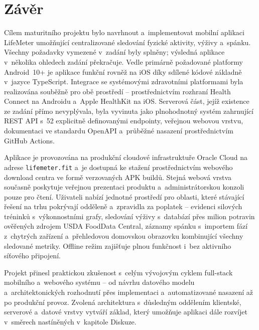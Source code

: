 \chapter*{Závěr}

Cílem maturitního projektu bylo navrhnout a~implementovat mobilní aplikaci
LifeMeter umožňující centralizované sledování fyzické aktivity, výživy a~spánku.
Všechny požadavky vymezené v~zadání byly splněny; výsledná aplikace v~několika
ohledech zadání překračuje. Vedle primárně požadované platformy Android~10+
je aplikace funkční rovněž na iOS díky sdílené kódové základně v~jazyce
TypeScript. Integrace se systémovými zdravotními platformami byla realizována
souběžně pro obě prostředí -- prostřednictvím rozhraní Health Connect na
Androidu a~Apple HealthKit na iOS. Serverová část, jejíž existence ze zadání
přímo nevyplývala, byla vyvinuta jako plnohodnotný systém zahrnující REST API
s~52 explicitně definovanými endpointy, veřejnou webovou vrstvu, dokumentaci
ve standardu OpenAPI a~průběžné nasazení prostřednictvím GitHub Actions.

Aplikace je provozována na produkční cloudové infrastruktuře Oracle Cloud
na adrese \texttt{lifemeter.fit} a~je dostupná ke stažení prostřednictvím
webového download centra ve formě verzovaných APK buildů. Stejná webová
vrstva současně poskytuje veřejnou prezentaci produktu a~administrátorskou
konzoli pouze pro čtení. Uživateli nabízí jednotné prostředí pro oblasti, které stávající řešení
na trhu pokrývají odděleně a~zpravidla za poplatek -- evidenci silových
tréninků s~výkonnostními grafy, sledování výživy s~databází přes milion
potravin ověřených zdrojem USDA FoodData Central, záznamy spánku s~importem
fází z~chytrých zařízení a~přehledovou domovskou obrazovku kombinující
všechny sledované metriky. Offline režim zajišťuje plnou funkčnost i~bez
aktivního síťového připojení.

Projekt přinesl praktickou zkušenost s~celým vývojovým cyklem
full-stack mobilního a~webového systému -- od návrhu datového modelu a~architektonických
rozhodnutí přes implementaci a~automatizované nasazení až po produkční provoz.
Zvolená architektura s~důsledným oddělením klientské, serverové a~datové vrstvy
vytváří základ, který umožňuje aplikaci dále rozvíjet v~směrech nastíněných
v~kapitole Diskuze.
